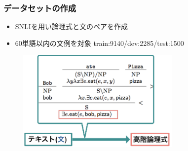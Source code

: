\documentclass[dvipdfmx]{beamer}
\begin{document}
\begin{frame}
\frametitle{データセットの作成}
\begin{itemize}
  \item
SNLIを用い論理式と文のペアを作成

\item 60単語以内の文例を対象
train:9140/dev:2285/test:1500\\

\end{itemize}
\begin{center}
\begin{figure}[h]
	\includegraphics[width=8cm]{editdata.png}
        \label{fig:editdata}
\end{figure}
\end{center}

\end{frame}
\end{document}

